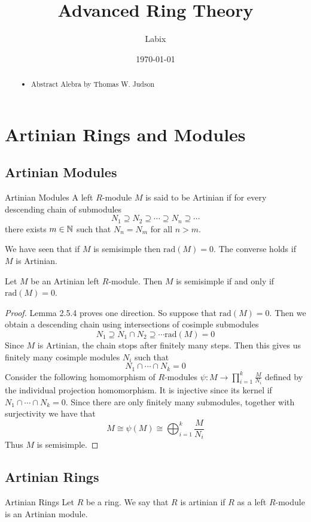 \documentclass[a4paper]{article}
\title{Advanced Ring Theory}
\author{Labix}
\date{\today}
\begin{document}
\maketitle
\begin{abstract}
\begin{itemize}
\item Abstract Alebra by Thomas W. Judson
\end{itemize}
\end{abstract}
\pagebreak
\tableofcontents
\pagebreak

\section{Artinian Rings and Modules}
\subsection{Artinian Modules}
\begin{defn}{Artinian Modules}{} A left $R$-module $M$ is said to be Artinian if for every descending chain of submodules $$N_1\supseteq N_2\supseteq\cdots\supseteq N_n\supseteq\cdots$$ there exists $m\in\mathbb{N}$ such that $N_n=N_m$ for all $n>m$. 
\end{defn}

We have seen that if $M$ is semisimple then $\text{rad}(M)=0$. The converse holds if $M$ is Artinian. 

\begin{thm}{}{} Let $M$ be an Artinian left $R$-module. Then $M$ is semisimple if and only if $\text{rad}(M)=0$. \tcbline
\begin{proof}
Lemma 2.5.4 proves one direction. So suppose that $\text{rad}(M)=0$. Then we obtain a descending chain using intersections of cosimple submodules $$N_1\supseteq N_1\cap N_2\supseteq\cdots\text{rad}(M)=0$$ Since $M$ is Artinian, the chain stops after finitely many steps. Then this gives us finitely many cosimple modules $N_i$ such that $$N_1\cap\cdots\cap N_k=0$$ Consider the following homomorphism of $R$-modules $\psi:M\to\prod_{i=1}^k\frac{M}{N_i}$ defined by the individual projection homomorphism. It is injective since its kernel if $N_1\cap\cdots\cap N_k=0$. Since there are only finitely many submodules, together with surjectivity we have that $$M\cong\psi(M)\cong\bigoplus_{i=1}^k\frac{M}{N_i}$$ Thus $M$ is semisimple. 
\end{proof}
\end{thm}

\subsection{Artinian Rings}
\begin{defn}{Artinian Rings}{} Let $R$ be a ring. We say that $R$ is artinian if $R$ as a left $R$-module is an Artinian module. 
\end{defn}
\end{document}
